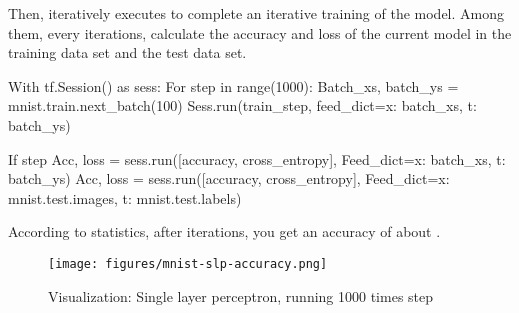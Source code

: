 \begin{content}
Then, iteratively executes  to complete an iterative training of the model. Among them, every  iterations, calculate the accuracy and loss of the current model in the training data set and the test data set.

\begin{leftbar}
\begin{python}
With tf.Session() as sess:
  For step in range(1000):
    Batch_xs, batch_ys = mnist.train.next_batch(100)        
    Sess.run(train_step, feed_dict={x: batch_xs, t: batch_ys})
    
    If step %
      Acc, loss = sess.run([accuracy, cross_entropy], 
        Feed_dict={x: batch_xs, t: batch_ys})
      Acc, loss = sess.run([accuracy, cross_entropy], 
        Feed_dict={x: mnist.test.images, t: mnist.test.labels}) 
\end{python}
\end{leftbar}

According to statistics, after  iterations, you get an accuracy of about .

\begin{figure}[H]
\centering
\texttt{[image: figures/mnist-slp-accuracy.png]}
\caption{Visualization: Single layer perceptron, running 1000 times step}
 \label{fig:mnist-slp-accuracy}
\end{figure}

\end{content}